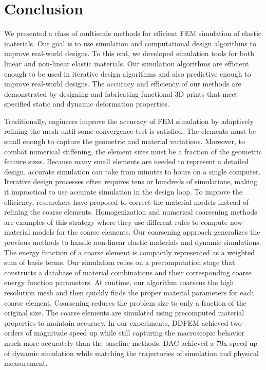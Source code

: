 \chapter{Conclusion}
We presented a class of multiscale methods for efficient FEM simulation of elastic materials.
Our goal is to use simulation and computational design algorithms to improve real-world designs.
To this end, we developed simulation tools for both linear and non-linear elastic materials.
Our simulation algorithms are efficient enough to be used in iterative design algorithms and also predictive enough to improve real-world designs.
The accuracy and efficiency of our methods are demonstrated by designing and fabricating functional 3D prints that meet specified static and dynamic deformation properties.

Traditionally, engineers improve the accuracy of FEM simulation by adaptively refining the mesh until some convergence test is satisfied.
The elements must be small enough to capture the geometric and material variations.
Moreover, to combat numerical stiffening, the element sizes must be a fraction of the geometric feature sizes.
Because many small elements are needed to represent a detailed design, accurate simulation can take from minutes to hours on a single computer.
Iterative design processes often requires tens or hundreds of simulations, making it impractical to use accurate simulation in the design loop.
To improve the efficiency, researchers have proposed to correct the material models instead of refining the coarse elements.
Homogenization and numerical coarsening methods are examples of this strategy where they use different rules to compute new material models for the coarse elements.
Our coarsening approach generalizes the previous methods to handle non-linear elastic materials and dynamic simulations.
The energy function of a coarse element is compactly represented as a weighted sum of basis terms.
Our simulation relies on a precomputation stage that constructs a database of material combinations and their corresponding coarse energy function parameters.
At runtime, our algorithm coarsens the high resolution mesh and then quickly finds the proper material parameters for each coarse element.
Coarsening reduces the problem size to only a fraction of the original size.
The coarse elements are simulated using precomputed material properties to maintain accuracy.
In our experiments, DDFEM achieved two-orders of magnitude speed up while still capturing the macroscopic behavior much more accurately than the baseline methods.
DAC achieved a 79x speed up of dynamic simulation while matching the trajectories of simulation and physical measurement.

